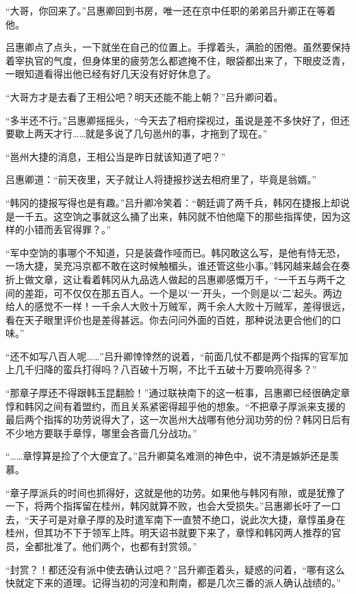 “大哥，你回来了。”吕惠卿回到书房，唯一还在京中任职的弟弟吕升卿正在等着他。

吕惠卿点了点头，一下就坐在自己的位置上。手撑着头，满脸的困倦。虽然要保持着宰执官的气度，但身体里的疲劳怎么都遮掩不住，眼袋都出来了，下眼皮泛青，一眼知道看得出他已经有好几天没有好好休息了。

“大哥方才是去看了王相公吧？明天还能不能上朝？”吕升卿问着。

“多半还不行。”吕惠卿摇摇头，“今天去了相府探视过，虽说是差不多快好了，但还要歇上两天才行……就是多说了几句邕州的事，才拖到了现在。”

“邕州大捷的消息，王相公当是昨日就该知道了吧？”

吕惠卿道：“前天夜里，天子就让人将捷报抄送去相府里了，毕竟是翁婿。”

“韩冈的捷报写得也是有趣。”吕升卿冷笑着：“朝廷调了两千兵，韩冈在捷报上却说是一千五。这空饷之事就这么捅了出来，韩冈就不怕他麾下的那些指挥使，因为这样的小错而丢官得罪？。”

“军中空饷的事哪个不知道，只是装聋作哑而已。韩冈敢这么写，是他有恃无恐，一场大捷，吴充冯京都不敢在这时候触楣头，谁还管这些小事。”韩冈越来越会在奏折上做文章，这让看着韩冈从九品选人做起的吕惠卿感慨万千，“一千五与两千之间的差距，可不仅仅在那五百人。一个是以‘一’开头，一个则是以‘二’起头。两边给人的感觉不一样！一千余人大败十万贼军，两千余人大败十万贼军，差得很远，看在天子眼里评价也是差得甚远。你去问问外面的百姓，那种说法更合他们的口味。”

“还不如写八百人呢……”吕升卿悻悻然的说着，“前面几仗不都是两个指挥的官军加上几千归降的蛮兵打得吗？八百破十万啊，不比千五破十万要响亮得多？”

“那章子厚还不得跟韩玉昆翻脸！”通过联袂南下的这一桩事，吕惠卿已经很确定章惇和韩冈之间有着盟约，而且关系紧密得超乎他的想象。“不把章子厚派来支援的最后两个指挥的功劳说得大了，这一次邕州大战哪有他分润功劳的份？韩冈日后有不少地方要联手章惇，哪里会吝啬几分战功。”

“……章惇算是捡了个大便宜了。”吕升卿莫名难测的神色中，说不清是嫉妒还是羡慕。

“章子厚派兵的时间也抓得好，这就是他的功劳。如果他与韩冈有隙，或是犹豫了一下，将两个指挥留在桂州，韩冈就算不败，也会大受损失。”吕惠卿长吁了一口去，“天子可是对章子厚的及时遣军南下一直赞不绝口，说此次大捷，章惇虽身在桂州，但其功不下于领军上阵。明天诏书就要下来了，章惇和韩冈两人推荐的官员，全都批准了。他们两个，也都有封赏领。”

“封赏？！都还没有派中使去确认过吧？”吕升卿歪着头，疑惑的问着，“哪有这么快就定下来的道理。记得当初的河湟和荆南，都是几次三番的派人确认战绩的。”

